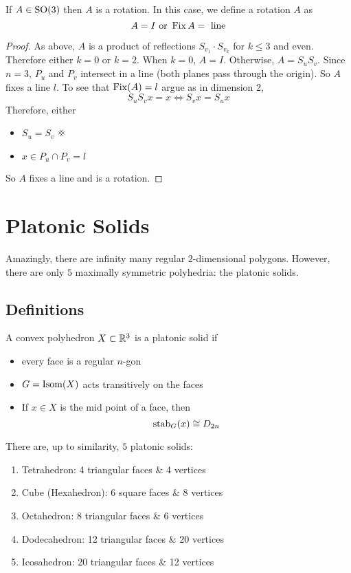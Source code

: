 \documentclass{article}
\begin{document}
\begin{lemma}[Elements of $\SO(3)$]
    If $A \in \mathrm{SO}(3)$ then $A$ is a rotation. In this case, we define a rotation $A$ as
    \[
        A = I \text{ or } \operatorname{Fix}{A} = \text{ line}
    \]
\end{lemma}
\begin{proof}
    As above, $A$ is a product of reflections $S_{v_1}\cdot S_{v_k}$ for $k \leq 3$ and even.
    Therefore either $k = 0$ or $k = 2$. When $k = 0$, $A = I$. Otherwise, $A = S_uS_v$. 
    Since $n = 3$, $P_u$ and $P_v$ intersect in a line (both planes pass through the origin).
    So $A$ fixes a line $l$. To see that $\operatorname{Fix}(A) = l$ argue as in dimension 2,
    \[
        S_uS_v x = x\Leftrightarrow S_v x = S_u x
    \]
    Therefore, either
    \begin{itemize}
        \item $S_u = S_v$ $\contradiction$
        \item $x \in P_u \cap P_v = l$
    \end{itemize}
    So $A$ fixes a line and is a rotation.
\end{proof}

\section{Platonic Solids}
Amazingly, there are infinity many regular $2$-dimensional polygons.
However, there are only $5$ maximally symmetric polyhedria: the platonic solids.

\subsection{Definitions}
\begin{defi}
    A convex polyhedron $X \subset \mathbb{R}^3$ is a platonic solid if
    \begin{itemize}
        \item every face is a regular $n$-gon
        \item $G = \operatorname{Isom}(X)$ acts transitively on the faces
        \item If $x \in X$ is the mid point of a face, then
        \[
            \operatorname{stab}_G(x) \cong D_{2n}  
        \]
    \end{itemize}
\end{defi}

\begin{thm}
    There are, up to similarity, $5$ platonic solids:
    \begin{enumerate}[label=(\arabic*)]
        \item Tetrahedron: 4 triangular faces \& 4 vertices
        \item Cube (Hexahedron): 6 square faces \& 8 vertices
        \item Octahedron: 8 triangular faces \& 6 vertices
        \item Dodecahedron: 12 triangular faces \& 20 vertices
        \item Icosahedron: 20 triangular faces \& 12 vertices
    \end{enumerate}
\end{thm}
\end{document}
